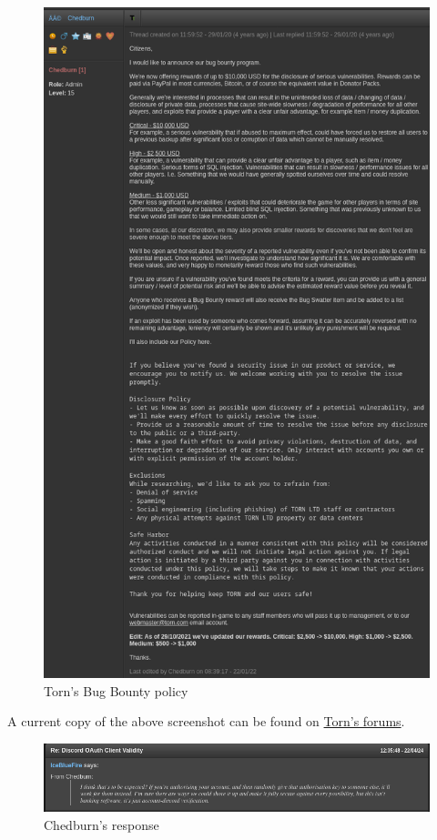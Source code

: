 \documentclass{article}
\begin{document}
{\begin{figure}[h!]
	\centering
	\includegraphics[scale=0.2]{torn-disclosure-policy.png}
	\caption{Torn's Bug Bounty policy}
	\label{fig:bug-bounty-policy}
\end{figure}

A current copy of the above screenshot can be found on \href{https://www.torn.com/forums.php#/p=threads&f=1&t=16141356&b=0&a=0}{Torn's forums}.

\begin{figure}[h!]
	\centering
	\includegraphics[scale=0.5]{ched-response-first.png}
	\caption{Chedburn's response}
	\label{fig:ched-response-1}
\end{figure}

}
\end{document}
